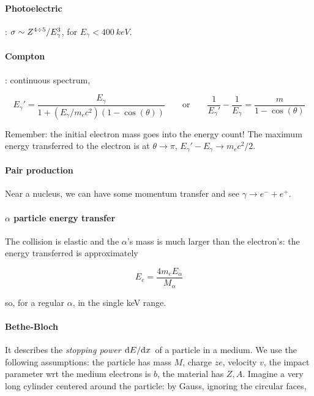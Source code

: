 \documentclass{article}
\begin{document}
\paragraph{Photoelectric}: \(\sigma \sim Z^{4 \divisionsymbol 5} / E_\gamma^3\),
for \(E _\gamma < \SI{400}{keV} \).

\paragraph{Compton}: continuous spectrum,

\begin{equation}
    E _ \gamma '  = \frac{E_ \gamma}{1 + (E_\gamma / m_e c^2) (1- \cos(\theta))}
    \qquad
    \text{or}
    \qquad
    \frac{1}{E_\gamma '}  - \frac{1}{E_{\gamma}} = \frac{m}{1- \cos(\theta) }
\end{equation}

Remember: the initial electron mass goes into the energy count!
The maximum energy transferred to the electron is at \(\theta \rightarrow \pi\), \(E_ \gamma ' - E_ \gamma \rightarrow m_e c^2/2\).

\paragraph{Pair production} Near a nucleus, we can have some momentum transfer and see \(\gamma \rightarrow
e^- + e^+\).

\paragraph{\(\alpha\) particle energy transfer}

The collision is elastic and the \(\alpha\)'s mass is much larger than the electron's: the energy transferred is approximately

\begin{equation}
    E_e = \frac{4 m_e E_\alpha}{M_\alpha}
\end{equation}

so, for a regular \(\alpha\), in the single keV range.

\paragraph{Bethe-Bloch}

It describes the \emph{stopping power} \(\dv*{E}{x} \) of a particle in a medium. We use the following assumptions: the particle has mass \(M\), charge \(ze\), velocity \(v\), the impact parameter wrt the medium electrons is \(b\), the material has \(Z, A\). Imagine a very long cylinder centered around the particle: by Gauss, ignoring the circular faces,
\end{document}
